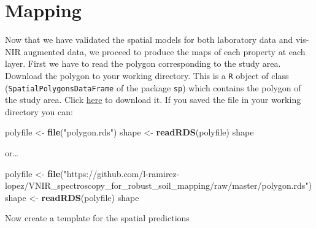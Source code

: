 \documentclass[]{book}
\newenvironment{Shaded}{\begin{snugshade}}{\end{snugshade}}
\newcommand{\KeywordTok}[1]{\textcolor[rgb]{0.13,0.29,0.53}{\textbf{#1}}}
\newcommand{\NormalTok}[1]{#1}
\newcommand{\StringTok}[1]{\textcolor[rgb]{0.31,0.60,0.02}{#1}}
\begin{document}
\hypertarget{mapping}{%
\section{Mapping}\label{mapping}}

Now that we have validated the spatial models for both laboratory data and vis-NIR augmented data, we proceed to produce the maps of each property at each layer.
First we have to read the polygon corresponding to the study area. Download the polygon to your working directory.
This is a \texttt{R} object of class (\texttt{SpatialPolygonsDataFrame} of the package \texttt{sp}) which contains the polygon of the study area. Click \href{https://github.com/l-ramirez-lopez/VNIR_spectroscopy_for_robust_soil_mapping/raw/master/polygon.rds}{here} to download it. If you saved the file in your working directory you can:

\begin{Shaded}
\begin{Highlighting}[]
\NormalTok{polyfile <-}\StringTok{ }\KeywordTok{file}\NormalTok{(}\StringTok{"polygon.rds"}\NormalTok{)}
\NormalTok{shape <-}\StringTok{ }\KeywordTok{readRDS}\NormalTok{(polyfile)}
\NormalTok{shape}
\end{Highlighting}
\end{Shaded}

or\ldots{}

\begin{Shaded}
\begin{Highlighting}[]
\NormalTok{polyfile <-}\StringTok{ }\KeywordTok{file}\NormalTok{(}\StringTok{"https://github.com/l-ramirez-lopez/VNIR_spectroscopy_for_robust_soil_mapping/raw/master/polygon.rds"}\NormalTok{)}
\NormalTok{shape <-}\StringTok{ }\KeywordTok{readRDS}\NormalTok{(polyfile)}
\NormalTok{shape}
\end{Highlighting}
\end{Shaded}

Now create a template for the spatial predictions
\end{document}
